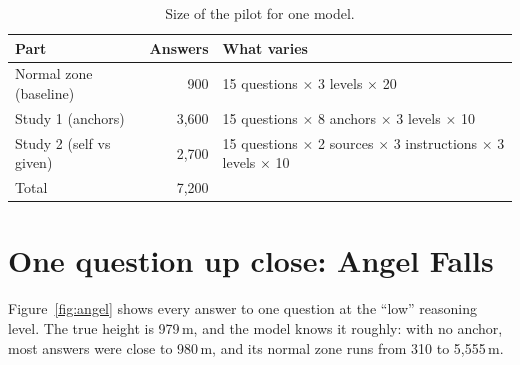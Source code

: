 \documentclass[11pt,a4paper]{article}
\begin{document}
\begin{table}[ht]
\centering\small
\begin{tabular}{lrp{8cm}}
\toprule
Part & Answers & What varies \\
\midrule
Normal zone (baseline) & 900 & 15 questions $\times$ 3 levels $\times$ 20 \\
Study 1 (anchors) & 3,600 & 15 questions $\times$ 8 anchors $\times$ 3 levels $\times$ 10 \\
Study 2 (self vs given) & 2,700 & 15 questions $\times$ 2 sources $\times$ 3 instructions $\times$ 3 levels $\times$ 10 \\
\midrule
Total & 7,200 & \\
\bottomrule
\end{tabular}
\caption{Size of the pilot for one model.}
\end{table}

\section{One question up close: Angel Falls}

Figure~\ref{fig:angel} shows every answer to one question at the \enquote{low} reasoning level. The true height is 979\,m, and the model knows it roughly: with no anchor, most answers were close to 980\,m, and its normal zone runs from 310 to 5,555\,m.
\end{document}
